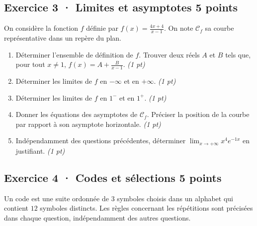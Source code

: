 \mxnewpage{}\par

\subsection*{Exercice 3 · Limites et asymptotes \hfill 5 points}On considère la fonction $f$ définie par $f(x)=\frac{4x+4}{x-1}$. On note $\mathcal C_f$ sa courbe représentative dans un repère du plan.

\begin{enumerate}

\item Déterminer l'ensemble de définition de $f$. Trouver deux réels $A$ et $B$ tels que, pour tout $x\ne1$, $f(x)=A+\frac B{x-1}$. \hfill\textit{(1 pt)}

\item Déterminer les limites de $f$ en $-\infty$ et en $+\infty$. \hfill\textit{(1 pt)}

\item Déterminer les limites de $f$ en $1^-$ et en $1^+$. \hfill\textit{(1 pt)}

\item Donner les équations des asymptotes de $\mathcal C_f$. Préciser la position de la courbe par rapport à son asymptote horizontale. \hfill\textit{(1 pt)}

\item Indépendamment des questions précédentes, déterminer $\displaystyle\lim_{x\to+\infty}x^{4}e^{-1x}$ en justifiant. \hfill\textit{(1 pt)}

\end{enumerate}

\subsection*{Exercice 4 · Codes et sélections \hfill 5 points}Un code est une suite ordonnée de $3$ symboles choisis dans un alphabet qui contient $12$ symboles distincts. Les règles concernant les répétitions sont précisées dans chaque question, indépendamment des autres questions.

